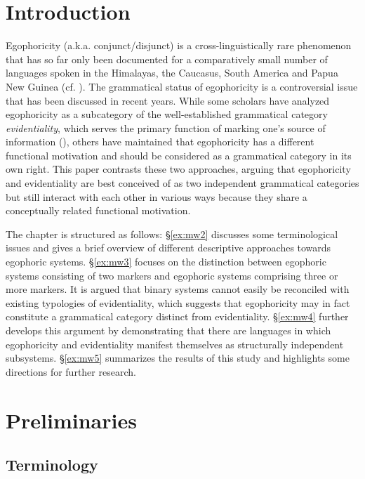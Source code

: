 \documentclass[output=paper]{langsci/langscibook}
\author{Manuel Widmer \affiliation{University of Zurich}}
\begin{document}
\maketitle

\section{Introduction}\label{s:mw1}

Egophoricity (a.k.a. conjunct/disjunct) is a cross-linguistically rare phenomenon that has so far only been documented for a comparatively small number of languages spoken in the Himalayas, the Caucasus, South America and Papua New Guinea (cf. \citealt{Creissels2008}). The grammatical status of egophoricity is a controversial issue that has been discussed in recent years. While some scholars have analyzed egophoricity as a subcategory of the well-established grammatical category \textit{evidentiality}, which serves the primary function of marking one’s source of information (\citealt{Aikhenvald2004}), others have maintained that egophoricity has a different functional motivation and should be considered as a grammatical category in its own right. This paper contrasts these two approaches, arguing that egophoricity and evidentiality are best conceived of as two independent grammatical categories but still interact with each other in various ways because they share a conceptually related functional motivation.

The chapter is structured as follows: §\ref{ex:mw2} discusses some terminological issues and gives a brief overview of different descriptive approaches towards egophoric systems. §\ref{ex:mw3} focuses on the distinction between egophoric systems consisting of two markers and egophoric systems comprising three or more markers. It is argued that binary systems cannot easily be reconciled with existing typologies of evidentiality, which suggests that egophoricity may in fact constitute a grammatical category distinct from evidentiality. §\ref{ex:mw4} further develops this argument by demonstrating that there are languages in which egophoricity and evidentiality manifest themselves as structurally independent subsystems. §\ref{ex:mw5} summarizes the results of this study and highlights some directions for further research.

\section{Preliminaries}\label{s:mw2}
\subsection{Terminology}\label{s:mw2-1}
\end{document}
